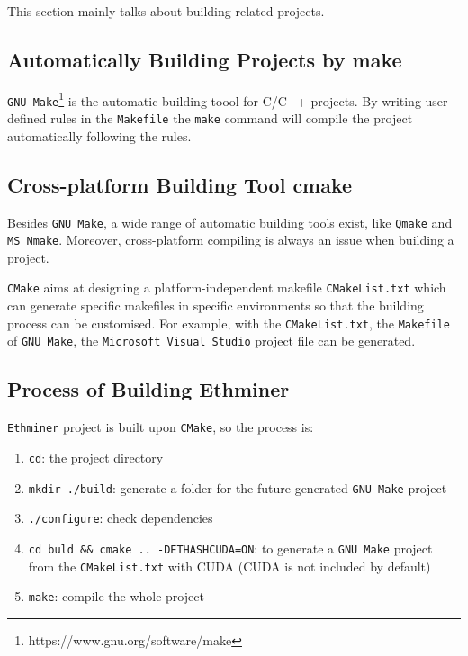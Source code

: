 \documentclass[11pt]{article}
\begin{document}
This section mainly talks about building related projects.

\subsection{Automatically Building Projects by make}

\texttt{GNU Make}\footnote{https://www.gnu.org/software/make} is the automatic building toool for C/C++ projects. By writing user-defined rules in the \texttt{Makefile} the \texttt{make} command will compile the project automatically following the rules.

\subsection{Cross-platform Building Tool cmake}

Besides \texttt{GNU Make}, a wide range of automatic building tools exist, like \texttt{Qmake} and \texttt{MS Nmake}. Moreover, cross-platform compiling is always an issue when building a project. 

\texttt{CMake} aims at designing a platform-independent makefile \texttt{CMakeList.txt} which can generate specific makefiles in specific environments so that the building process can be customised. For example, with the \texttt{CMakeList.txt}, the \texttt{Makefile} of \texttt{GNU Make}, the \texttt{Microsoft Visual Studio} project file can be generated. 

\subsection{Process of Building Ethminer}

\texttt{Ethminer} project is built upon \texttt{CMake}, so the process is:

\begin{enumerate}
\item \texttt{cd}: the project directory
\item \texttt{mkdir ./build}: generate a folder for the future generated \texttt{GNU Make} project
\item \texttt{./configure}: check dependencies
\item \texttt{cd buld \&\& cmake .. -DETHASHCUDA=ON}: to generate a \texttt{GNU Make} project from the \texttt{CMakeList.txt} with CUDA (CUDA is not included by default)
\item \texttt{make}: compile the whole project
\end{enumerate}
\end{document}
